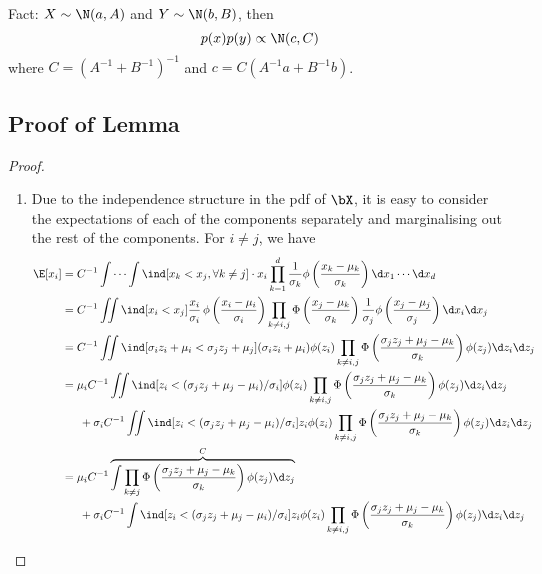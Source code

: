 Fact: $X \sim \N(a,A)$ and $Y \sim \N(b,B)$, then 
\[
  p(x)p(y) \propto \N(c,C)
\]
where $C = (A^{-1} + B^{-1})^{-1}$ and $c = C(A^{-1}a + B^{-1}b)$.

\subsection{Proof of Lemma}

\begin{proof}
\begin{enumerate}[label=(\roman*)]
  \item Due to the independence structure in the pdf of $\bX$, it is easy to consider the expectations of each of the components separately and marginalising out the rest of the components. For $i \neq j$, we have
  \begin{align*}
    \E[x_i] 
    &= C^{-1} \idotsint \ind[x_k < x_j, \forall k \neq j] \cdot x_i  \prod_{k=1}^d \frac{1}{\sigma_k}\phi \left( \frac{x_k - \mu_k}{\sigma_k} \right) \d x_1 \cdots \d x_d \\
    &= C^{-1} \iint \ind[x_i < x_j] \frac{x_i}{\sigma_i} \, \phi \left( \frac{x_i - \mu_i}{\sigma_i} \right)  \prod_{k \neq i,j} \Phi \left( \frac{x_j - \mu_k}{\sigma_k} \right) \frac{1}{\sigma_j}\phi \left( \frac{x_j - \mu_j}{\sigma_j} \right) \d x_i \d x_j \\
    &= C^{-1} \iint \ind[\sigma_i z_i + \mu_i < \sigma_j z_j + \mu_j] (\sigma_i z_i + \mu_i) \phi (z_i)  \prod_{k \neq i,j} \Phi \left( \frac{\sigma_j z_j + \mu_j - \mu_k}{\sigma_k} \right) \phi (z_j) \d z_i \d z_j \\
    &= \mu_i C^{-1} \iint \ind[ z_i < (\sigma_j z_j + \mu_j - \mu_i) / \sigma_i] \phi (z_i)  \prod_{k \neq i,j} \Phi \left( \frac{\sigma_j z_j + \mu_j - \mu_k}{\sigma_k} \right) \phi (z_j) \d z_i \d z_j \\*    
    &\phantom{==} + \sigma_i C^{-1} \iint \ind[z_i < (\sigma_j z_j + \mu_j - \mu_i) / \sigma_i] z_i \phi (z_i)  \prod_{k \neq i,j} \Phi \left( \frac{\sigma_j z_j + \mu_j - \mu_k}{\sigma_k} \right) \phi (z_j) \d z_i \d z_j \\
    &= \mu_i C^{-1} 
    \overbrace{
    \int  \prod_{k \neq j} \Phi \left( \frac{\sigma_j z_j + \mu_j - \mu_k}{\sigma_k} \right) \phi (z_j) \d z_j
    }^{C} \\  
    &\phantom{==} + \sigma_i C^{-1} \int \ind[ z_i < (\sigma_j z_j + \mu_j - \mu_i) / \sigma_i] z_i \phi (z_i) \prod_{k \neq i,j} \Phi \left( \frac{\sigma_j z_j + \mu_j - \mu_k}{\sigma_k} \right) \phi (z_j) \d z_i \d z_j \\

\end{align*}
\end{enumerate}
\end{proof}
